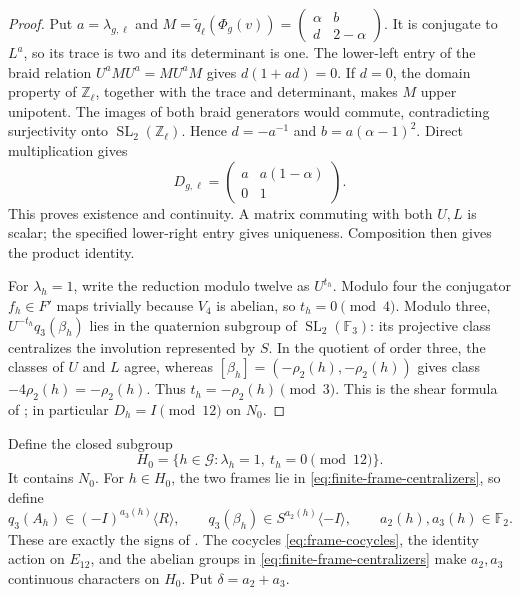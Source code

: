 \begin{proof}
Put $a=\lambda_{g,\ell}$ and
$M=\widetilde q_\ell(\Phi_g(v))=
\left(\begin{smallmatrix}\alpha&b\\d&2-\alpha\end{smallmatrix}\right)$.
It is conjugate to $L^a$, so its trace is two and its determinant
is one. The lower-left entry of the braid relation
$U^aMU^a=MU^aM$ gives $d(1+ad)=0$.
If $d=0$, the domain property of $\mathbb Z_\ell$, together with
the trace and determinant, makes $M$ upper unipotent. The images
of both braid generators would commute, contradicting surjectivity
onto $\operatorname{SL}_2(\mathbb Z_\ell)$. Hence $d=-a^{-1}$
and $b=a(\alpha-1)^2$. Direct multiplication gives
\[
 D_{g,\ell}=
  \begin{pmatrix}a&a(1-\alpha)\\0&1\end{pmatrix}.
\]
This proves existence and continuity. A matrix commuting with both
$U,L$ is scalar; the specified lower-right entry gives uniqueness.
Composition then gives the product identity.

For $\lambda_h=1$, write the reduction modulo twelve as $U^{t_h}$.
Modulo four the conjugator $f_h\in F'$ maps trivially because
$V_4$ is abelian, so $t_h=0\pmod4$. Modulo three,
$U^{-t_h}q_3(\beta_h)$ lies in the quaternion subgroup of
$\operatorname{SL}_2(\mathbb F_3)$: its projective class centralizes
the involution represented by $S$. In the quotient of order three,
the classes of $U$ and $L$ agree, whereas
$[\beta_h]=(-\rho_2(h),-\rho_2(h))$ gives class
$-4\rho_2(h)=-\rho_2(h)$. Thus
$t_h=-\rho_2(h)\pmod3$. This is the shear formula of
\cite[Lemma~13]{H17}; in particular $D_h=I\pmod{12}$ on $N_0$.
\end{proof}

Define the closed subgroup
\[
 H_0=\{h\in\mathcal G:\lambda_h=1,\ t_h=0\pmod{12}\}.
\]
It contains $N_0$. For $h\in H_0$, the two frames lie in
\eqref{eq:finite-frame-centralizers}, so define
\begin{equation}
 q_3(A_h)\in(-I)^{a_3(h)}\langle R\rangle,
 \qquad
 q_3(\beta_h)\in S^{a_2(h)}\langle-I\rangle,
 \qquad a_2(h),a_3(h)\in\mathbb F_2.
 \label{eq:frame-sign-definition}
\end{equation}
These are exactly the signs of \cite[Definition~14]{H17}.
The cocycles \eqref{eq:frame-cocycles}, the identity action on
$E_{12}$, and the abelian groups in
\eqref{eq:finite-frame-centralizers} make $a_2,a_3$ continuous
characters on $H_0$. Put $\delta=a_2+a_3$.

